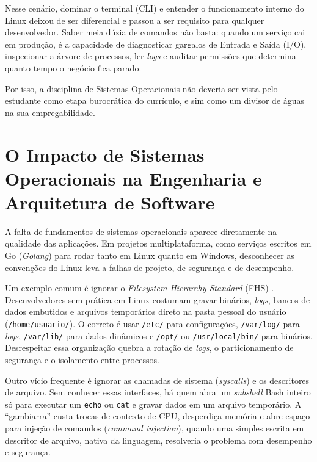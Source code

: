 Nesse cenário, dominar o terminal (CLI) e entender o funcionamento interno do Linux deixou de ser diferencial e passou a ser requisito para qualquer desenvolvedor. Saber meia dúzia de comandos não basta: quando um serviço cai em produção, é a capacidade de diagnosticar gargalos de Entrada e Saída (I/O), inspecionar a árvore de processos, ler \textit{logs} e auditar permissões que determina quanto tempo o negócio fica parado.

Por isso, a disciplina de Sistemas Operacionais não deveria ser vista pelo estudante como etapa burocrática do currículo, e sim como um divisor de águas na sua empregabilidade.

\section{O Impacto de Sistemas Operacionais na Engenharia e Arquitetura de Software}
\label{sec:impacto-engenharia}

A falta de fundamentos de sistemas operacionais aparece diretamente na qualidade das aplicações. Em projetos multiplataforma, como serviços escritos em Go (\textit{Golang}) para rodar tanto em Linux quanto em Windows, desconhecer as convenções do Linux leva a falhas de projeto, de segurança e de desempenho.

Um exemplo comum é ignorar o \textit{Filesystem Hierarchy Standard} (FHS) \cite{fhs30}. Desenvolvedores sem prática em Linux costumam gravar binários, \textit{logs}, bancos de dados embutidos e arquivos temporários direto na pasta pessoal do usuário (\texttt{/home/usuario/}). O correto é usar \texttt{/etc/} para configurações, \texttt{/var/log/} para \textit{logs}, \texttt{/var/lib/} para dados dinâmicos e \texttt{/opt/} ou \texttt{/usr/local/bin/} para binários. Desrespeitar essa organização quebra a rotação de \textit{logs}, o particionamento de segurança e o isolamento entre processos.

Outro vício frequente é ignorar as chamadas de sistema (\textit{syscalls}) e os descritores de arquivo. Sem conhecer essas interfaces, há quem abra um \textit{subshell} Bash inteiro só para executar um \texttt{echo} ou \texttt{cat} e gravar dados em um arquivo temporário. A ``gambiarra'' custa trocas de contexto de CPU, desperdiça memória e abre espaço para injeção de comandos (\textit{command injection}), quando uma simples escrita em descritor de arquivo, nativa da linguagem, resolveria o problema com desempenho e segurança.

